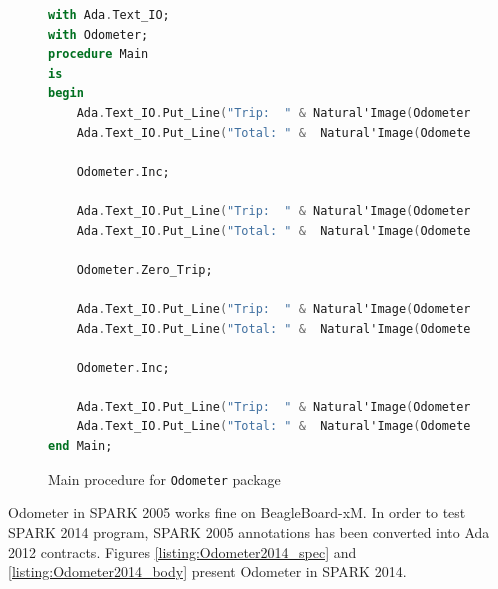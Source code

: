 \begin{figure}
\singlespacing
\begin{lstlisting}[language=ada, frame=single, gobble=0]
with Ada.Text_IO;
with Odometer;
procedure Main
is
begin
    Ada.Text_IO.Put_Line("Trip:  " & Natural'Image(Odometer.Read_Trip));
    Ada.Text_IO.Put_Line("Total: " &  Natural'Image(Odometer.Read_Total));

    Odometer.Inc;

    Ada.Text_IO.Put_Line("Trip:  " & Natural'Image(Odometer.Read_Trip));
    Ada.Text_IO.Put_Line("Total: " &  Natural'Image(Odometer.Read_Total));

    Odometer.Zero_Trip;

    Ada.Text_IO.Put_Line("Trip:  " & Natural'Image(Odometer.Read_Trip));
    Ada.Text_IO.Put_Line("Total: " &  Natural'Image(Odometer.Read_Total));

    Odometer.Inc;

    Ada.Text_IO.Put_Line("Trip:  " & Natural'Image(Odometer.Read_Trip));
    Ada.Text_IO.Put_Line("Total: " &  Natural'Image(Odometer.Read_Total));
end Main;
\end{lstlisting} 
\doublespacing
\caption{Main procedure for \lstinline{Odometer} package}
\label{listing:main}
\end{figure}

Odometer in SPARK 2005 works fine on BeagleBoard-xM. In order to test SPARK 2014 program, SPARK 2005 annotations has been converted into Ada 2012 contracts. Figures \ref{listing:Odometer2014_spec} and \ref{listing:Odometer2014_body} present Odometer in SPARK 2014.

